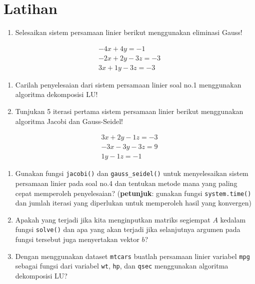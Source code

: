 \documentclass[]{book}
\providecommand{\tightlist}{%
  \setlength{\itemsep}{0pt}\setlength{\parskip}{0pt}}
\theoremstyle{definition}
\theoremstyle{definition}
\theoremstyle{definition}
\theoremstyle{remark}
\begin{document}
\hypertarget{latihan}{%
\section{Latihan}\label{latihan}}

\begin{enumerate}
\def\labelenumi{\arabic{enumi}.}
\tightlist
\item
  Selesaikan sistem persamaan linier berikut menggunakan eliminasi Gauss!
\end{enumerate}

\[
\begin{matrix}
  -4x+4y=-1 \\
  -2x+2y-3z=-3 \\
  3x+1y-3z=-3
\end{matrix}
\]

\begin{enumerate}
\def\labelenumi{\arabic{enumi}.}
\setcounter{enumi}{1}
\tightlist
\item
  Carilah penyelesaian dari sistem persamaan linier soal no.1 menggunakan algoritma dekomposisi LU!
\item
  Tunjukan 5 iterasi pertama sistem persamaan linier berikut menggunakan algoritma Jacobi dan Gauss-Seidel!
\end{enumerate}

\[
\begin{matrix}
  3x+2y-1z=-3 \\
  -3x-3y-3z=9 \\
  1y-1z=-1
\end{matrix}
\]

\begin{enumerate}
\def\labelenumi{\arabic{enumi}.}
\setcounter{enumi}{3}
\tightlist
\item
  Gunakan fungsi \texttt{jacobi()} dan \texttt{gauss\_seidel()} untuk menyelesaikan sistem persamaan linier pada soal no.4 dan tentukan metode mana yang paling cepat memperoleh penyelesaian? (\textbf{petunjuk}: gunakan fungsi \texttt{system.time()} dan jumlah iterasi yang diperlukan untuk memperoleh hasil yang konvergen)
\item
  Apakah yang terjadi jika kita menginputkan matriks segiempat \(A\) kedalam fungsi \texttt{solve()} dan apa yang akan terjadi jika selanjutnya argumen pada fungsi tersebut juga menyertakan vektor \(b\)?
\item
  Dengan menggunakan dataset \texttt{mtcars} buatlah persamaan linier variabel \texttt{mpg} sebagai fungsi dari variabel \texttt{wt}, \texttt{hp}, dan \texttt{qsec} menggunakan algoritma dekomposisi LU?
\end{enumerate}
\end{document}
